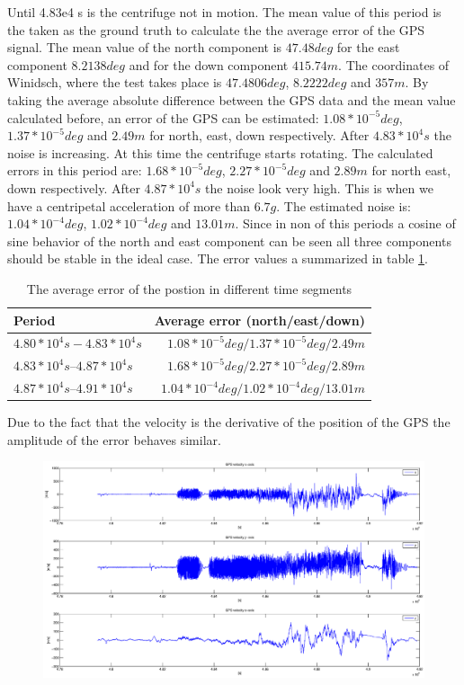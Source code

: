 \begin{description}
Until 4.83e4 s is the centrifuge not in motion. The mean value of this period is the taken as the ground truth to calculate the the average error of the GPS signal. The mean value of the north component is $47.48 deg$ for the east component $8.2138 deg$ and for the down component $415.74 m$. The coordinates of Winidsch, where the test takes place is $47.4806 deg$, $8.2222 deg$ and $357 m$. By taking the average absolute difference between the GPS data and the mean value calculated before, an error of the GPS can be estimated: $1.08*10^{-5} deg$, $1.37*10^{-5}deg$ and $2.49 m$ for north, east, down respectively. After $4.83*10^{4} s$ the noise is increasing. At this time the centrifuge starts rotating. The calculated  errors in this period are: $1.68*10^{-5} deg$, $2.27*10^{-5} deg$ and $2.89 m$ for north east, down respectively. After $4.87*10^{4} s$ the noise look very high. This is when we have  a centripetal acceleration of more than  $6.7 g$. The estimated noise is: $1.04*10^{-4} deg$, $1.02*10^{-4} deg$ and $13.01 m$. Since in non of this periods a cosine of sine behavior of the north and east component can be seen all three components should be stable in the ideal case. The error values a summarized in table \ref{ct_pos_error}.
\begin{table}[h]
\centering
\begin{tabular}{|l|r|}
\hline
Period & Average error (north/east/down) \\
\hline
$4.80*10^{4} s - 4.83*10^{4} s$&$1.08*10^{-5} deg / 1.37*10^{-5} deg / 2.49 m$\\
\hline
$4.83*10^{4} s – 4.87*10^{4} s$&$1.68*10^{-5} deg / 2.27*10^{-5} deg / 2.89 m$\\
\hline
$4.87*10^{4} s – 4.91*10^{4} s$&$1.04*10^{-4} deg/ 1.02*10^{-4} deg / 13.01 m$\\
\hline
\end{tabular}
\caption{The average error of the postion in different time segments}
\label{ct_pos_error}
\end{table}
Due to the fact that the velocity is the derivative of the position of the GPS the amplitude of the error behaves  similar.
\begin{figure}[h]
\includegraphics[width=1.2\textwidth]{pictures/ct_vel.eps}

\end{figure}
\end{description}
